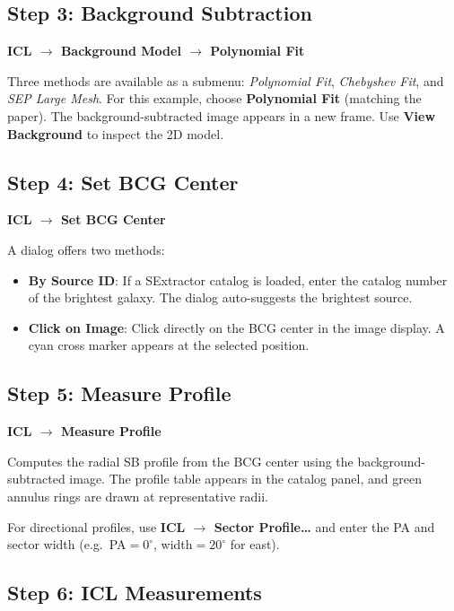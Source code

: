 \documentclass[11pt,fleqn]{book}
\begin{document}
\subsection{Step 3: Background Subtraction}

\textbf{ICL $\rightarrow$ Background Model $\rightarrow$ Polynomial Fit}

Three methods are available as a submenu: \emph{Polynomial Fit},
\emph{Chebyshev Fit}, and \emph{SEP Large Mesh}.
For this example, choose \textbf{Polynomial Fit} (matching the paper).
The background-subtracted image appears in a new frame.
Use \textbf{View Background} to inspect the 2D model.

\subsection{Step 4: Set BCG Center}

\textbf{ICL $\rightarrow$ Set BCG Center}

A dialog offers two methods:
\begin{itemize}
  \item \textbf{By Source ID}: If a SExtractor catalog is loaded,
        enter the catalog number of the brightest galaxy.
        The dialog auto-suggests the brightest source.
  \item \textbf{Click on Image}: Click directly on the BCG center in the
        image display. A cyan cross marker appears at the selected position.
\end{itemize}

\subsection{Step 5: Measure Profile}

\textbf{ICL $\rightarrow$ Measure Profile}

Computes the radial SB profile from the BCG center using the background-subtracted
image. The profile table appears in the catalog panel, and green annulus
rings are drawn at representative radii.

For directional profiles, use
\textbf{ICL $\rightarrow$ Sector Profile\ldots} and enter the PA and
sector width (e.g.\ PA$=0^\circ$, width$=20^\circ$ for east).

\subsection{Step 6: ICL Measurements}
\end{document}
